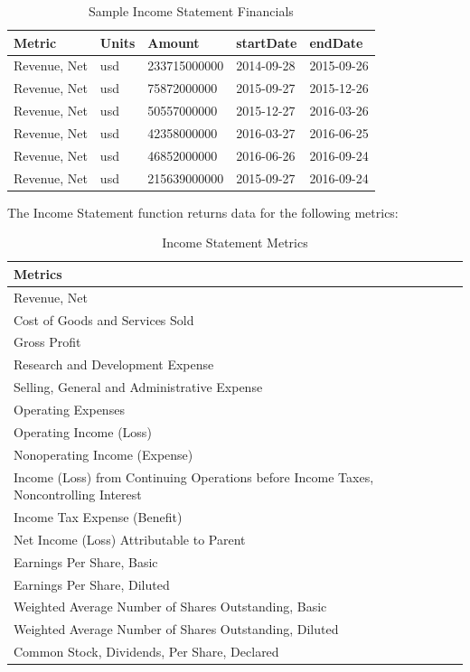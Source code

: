 \documentclass[]{book}
\theoremstyle{definition}
\theoremstyle{definition}
\theoremstyle{definition}
\theoremstyle{remark}
\begin{document}
\begin{table}[t]

\caption{\label{tab:unnamed-chunk-25}Sample Income Statement Financials}
\centering
\begin{tabular}{lllll}
\toprule
Metric & Units & Amount & startDate & endDate\\
\midrule
Revenue, Net & usd & 233715000000 & 2014-09-28 & 2015-09-26\\
Revenue, Net & usd & 75872000000 & 2015-09-27 & 2015-12-26\\
Revenue, Net & usd & 50557000000 & 2015-12-27 & 2016-03-26\\
Revenue, Net & usd & 42358000000 & 2016-03-27 & 2016-06-25\\
Revenue, Net & usd & 46852000000 & 2016-06-26 & 2016-09-24\\
\addlinespace
Revenue, Net & usd & 215639000000 & 2015-09-27 & 2016-09-24\\
\bottomrule
\end{tabular}
\end{table}

The Income Statement function returns data for the following metrics:

\begin{table}[t]

\caption{\label{tab:unnamed-chunk-26}Income Statement Metrics}
\centering
\begin{tabular}{l}
\toprule
Metrics\\
\midrule
Revenue, Net\\
Cost of Goods and Services Sold\\
Gross Profit\\
Research and Development Expense\\
Selling, General and Administrative Expense\\
\addlinespace
Operating Expenses\\
Operating Income (Loss)\\
Nonoperating Income (Expense)\\
Income (Loss) from Continuing Operations before Income Taxes, Noncontrolling Interest\\
Income Tax Expense (Benefit)\\
\addlinespace
Net Income (Loss) Attributable to Parent\\
Earnings Per Share, Basic\\
Earnings Per Share, Diluted\\
Weighted Average Number of Shares Outstanding, Basic\\
Weighted Average Number of Shares Outstanding, Diluted\\
\addlinespace
Common Stock, Dividends, Per Share, Declared\\
\bottomrule
\end{tabular}
\end{table}
\end{document}
